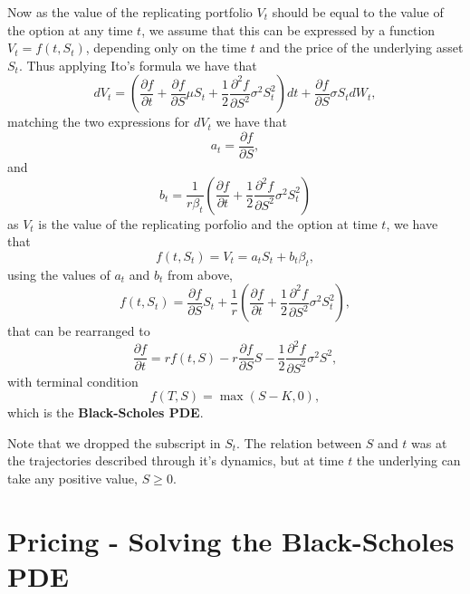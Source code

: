 Now as the value of the replicating portfolio $V_t$ should be equal to the value of the option at any time $t$,
we assume that this can be expressed by a function $V_t = f(t, S_t)$,
depending only on the time $t$ and the price of the underlying asset $S_t$.
Thus applying Ito's formula we have that
\begin{equation*}
    dV_t =
        \left( \frac{\partial f}{\partial t} + \frac{\partial f}{\partial S} \mu S_t + \frac{1}{2} \frac{\partial^2 f}{\partial S^2} \sigma^2 S_t^2 \right) dt
        + \frac{\partial f}{\partial S} \sigma S_t dW_t,
\end{equation*}
matching the two expressions for $dV_t$ we have that
\begin{equation*}
    a_t = \frac{\partial f}{\partial S},
\end{equation*}
and 
\begin{equation*}
    b_t =
        \frac{1}{r \beta_t}
        \left( \frac{\partial f}{\partial t} + \frac{1}{2} \frac{\partial^2 f}{\partial S^2} \sigma^2 S_t^2 \right)
\end{equation*}
as $V_t$ is the value of the replicating porfolio and the option at time $t$,
we have that
\begin{equation*}
    f(t, S_t) = V_t = a_t S_t + b_t \beta_t,
\end{equation*}
using the values of $a_t$ and $b_t$ from above,
\begin{equation*}
    f(t, S_t) =
        \frac{\partial f}{\partial S} S_t 
        + \frac{1}{r} \left( \frac{\partial f}{\partial t} + \frac{1}{2} \frac{\partial^2 f}{\partial S^2} \sigma^2 S_t^2 \right),
\end{equation*}
that can be rearranged to
\begin{equation}\label{eq:bs_pde}
    \frac{\partial f}{\partial t} =
        r f(t, S)
        - r \frac{\partial f}{\partial S} S 
        - \frac{1}{2} \frac{\partial^2 f}{\partial S^2} \sigma^2 S^2,
\end{equation}
with terminal condition
\begin{equation*}
    f(T, S) = \max(S - K, 0),
\end{equation*}
which is the \textbf{Black-Scholes PDE}.

Note that we dropped the subscript in $S_t$.
The relation between $S$ and $t$ was at the trajectories described through it's dynamics,
but at time $t$ the underlying can take any positive value, $S \geq 0$.


\section{Pricing - Solving the Black-Scholes PDE}\label{sec:bs_pricing}

